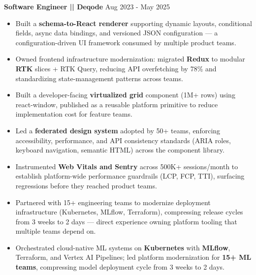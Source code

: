 \documentclass[100pt,a4paper]{article}
\begin{document}
\vspace{5pt}
\textbf{Software Engineer || Deqode}
\hfill Aug 2023 - May 2025
\begin{itemize}
\vspace{2pt}
\item {Built a \textbf{schema-to-React renderer} supporting dynamic layouts, conditional fields, async data bindings, and versioned JSON configuration — a configuration-driven UI framework consumed by multiple product teams.}
\item {Owned frontend infrastructure modernization: migrated \textbf{Redux} to modular \textbf{RTK} slices + RTK Query, reducing API overfetching by 78\% and standardizing state-management patterns across teams.}
\item {Built a developer-facing \textbf{virtualized grid} component (1M+ rows) using react-window, published as a reusable platform primitive to reduce implementation cost for feature teams.}
\item {Led a \textbf{federated design system} adopted by 50+ teams, enforcing accessibility, performance, and API consistency standards (ARIA roles, keyboard navigation, semantic HTML) across the component library.}
\item {Instrumented \textbf{Web Vitals and Sentry} across 500K+ sessions/month to establish platform-wide performance guardrails (LCP, FCP, TTI), surfacing regressions before they reached product teams.}
\item {Partnered with 15+ engineering teams to modernize deployment infrastructure (Kubernetes, MLflow, Terraform), compressing release cycles from 3 weeks to 2 days — direct experience owning platform tooling that multiple teams depend on.}
\item {Orchestrated cloud-native ML systems on \textbf{Kubernetes} with \textbf{MLflow}, Terraform, and Vertex AI Pipelines; led platform modernization for \textbf{15+ ML teams}, compressing model deployment cycle from 3 weeks to 2 days.}

\end{itemize}
\end{document}
